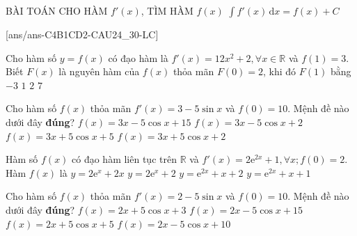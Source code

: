 \begin{dang}{BÀI TOÁN CHO HÀM $f'(x)$, TÌM HÀM $f(x)$}
	$\displaystyle \int f'(x) \mathrm{\,d}x=f(x)+C$
\end{dang}
[ans/ans-C4B1CD2-CAU24_30-LC]
\TN
\begin{ex}%
	Cho hàm số $y=f(x)$ có đạo hàm là $f'(x)=12x^2+2, \forall x\in \mathbb{R}$ và $f(1)=3$. Biết $F(x)$ là nguyên hàm của $f(x)$ thỏa mãn $F(0)=2$, khi đó $F(1)$ bằng
	\choice
	{$-3$}
	{\True $1$}
	{$2$}
	{$7$}
\end{ex}
\begin{ex}%
	Cho hàm số $f(x)$ thỏa mãn $f'(x)=3-5\sin x$ và $f(0)=10$. Mệnh đề nào dưới đây \textbf{đúng}?
	\choice
	{$f(x)=3x-5\cos x+15$}
	{$f(x)=3x-5\cos x+2$}
	{\True $f(x)=3x+5\cos x+5$}
	{$f(x)=3x+5\cos x+2$}
\end{ex}
\begin{ex}%
	Hàm số $f(x)$ có đạo hàm liên tục trên $\mathbb{R}$ và $f'(x)=2\mathrm{e}^{2x}+1, \forall x; f(0)=2$. Hàm $f(x)$ là
	\choice
	{$y=2\mathrm{e}^x+2x$}
	{$y=2\mathrm{e}^x+2$}
	{$y=\mathrm{e}^{2x}+x+2$}
	{\True $y=\mathrm{e}^{2x}+x+1$}
\end{ex}
\begin{ex}%
	Cho hàm số $f(x)$ thỏa mãn $f'(x)=2-5\sin x$ và $ f(0)=10$. Mệnh đề nào dưới đây \textbf{đúng}?
	\choice
	{$f(x)=2x+5\cos x+3$}
	{$f(x)=2x-5\cos x+15$}
	{\True $f(x)=2x+5\cos x+5$}
	{$f(x)=2x-5\cos x+10$}
\end{ex}
